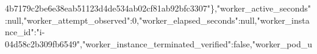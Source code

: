 \documentclass[10pt]{article}
\begin{document}
4\allowbreak{}b\allowbreak{}7\allowbreak{}1\allowbreak{}7\allowbreak{}9\allowbreak{}c\allowbreak{}2\allowbreak{}b\allowbreak{}e\allowbreak{}6\allowbreak{}e\allowbreak{}3\allowbreak{}8\allowbreak{}e\allowbreak{}a\allowbreak{}b\allowbreak{}5\allowbreak{}1\allowbreak{}1\allowbreak{}2\allowbreak{}3\allowbreak{}d\allowbreak{}4\allowbreak{}d\allowbreak{}e\allowbreak{}5\allowbreak{}3\allowbreak{}4\allowbreak{}a\allowbreak{}b\allowbreak{}0\allowbreak{}2\allowbreak{}c\allowbreak{}f\allowbreak{}8\allowbreak{}1\allowbreak{}a\allowbreak{}b\allowbreak{}9\allowbreak{}2\allowbreak{}b\allowbreak{}f\allowbreak{}c\allowbreak{}3\allowbreak{}3\allowbreak{}0\allowbreak{}7\allowbreak{}"\allowbreak{}\}\allowbreak{},\allowbreak{}"\allowbreak{}w\allowbreak{}o\allowbreak{}r\allowbreak{}k\allowbreak{}e\allowbreak{}r\allowbreak{}\_\allowbreak{}a\allowbreak{}c\allowbreak{}t\allowbreak{}i\allowbreak{}v\allowbreak{}e\allowbreak{}\_\allowbreak{}s\allowbreak{}e\allowbreak{}c\allowbreak{}o\allowbreak{}n\allowbreak{}d\allowbreak{}s\allowbreak{}"\allowbreak{}:\allowbreak{}n\allowbreak{}u\allowbreak{}l\allowbreak{}l\allowbreak{},\allowbreak{}"\allowbreak{}w\allowbreak{}o\allowbreak{}r\allowbreak{}k\allowbreak{}e\allowbreak{}r\allowbreak{}\_\allowbreak{}a\allowbreak{}t\allowbreak{}t\allowbreak{}e\allowbreak{}m\allowbreak{}p\allowbreak{}t\allowbreak{}\_\allowbreak{}o\allowbreak{}b\allowbreak{}s\allowbreak{}e\allowbreak{}r\allowbreak{}v\allowbreak{}e\allowbreak{}d\allowbreak{}"\allowbreak{}:\allowbreak{}0\allowbreak{},\allowbreak{}"\allowbreak{}w\allowbreak{}o\allowbreak{}r\allowbreak{}k\allowbreak{}e\allowbreak{}r\allowbreak{}\_\allowbreak{}e\allowbreak{}l\allowbreak{}a\allowbreak{}p\allowbreak{}s\allowbreak{}e\allowbreak{}d\allowbreak{}\_\allowbreak{}s\allowbreak{}e\allowbreak{}c\allowbreak{}o\allowbreak{}n\allowbreak{}d\allowbreak{}s\allowbreak{}"\allowbreak{}:\allowbreak{}n\allowbreak{}u\allowbreak{}l\allowbreak{}l\allowbreak{},\allowbreak{}"\allowbreak{}w\allowbreak{}o\allowbreak{}r\allowbreak{}k\allowbreak{}e\allowbreak{}r\allowbreak{}\_\allowbreak{}i\allowbreak{}n\allowbreak{}s\allowbreak{}t\allowbreak{}a\allowbreak{}n\allowbreak{}c\allowbreak{}e\allowbreak{}\_\allowbreak{}i\allowbreak{}d\allowbreak{}"\allowbreak{}:\allowbreak{}"\allowbreak{}i\allowbreak{}-\allowbreak{}0\allowbreak{}4\allowbreak{}d\allowbreak{}5\allowbreak{}8\allowbreak{}c\allowbreak{}2\allowbreak{}b\allowbreak{}3\allowbreak{}0\allowbreak{}9\allowbreak{}f\allowbreak{}b\allowbreak{}6\allowbreak{}5\allowbreak{}4\allowbreak{}9\allowbreak{}"\allowbreak{},\allowbreak{}"\allowbreak{}w\allowbreak{}o\allowbreak{}r\allowbreak{}k\allowbreak{}e\allowbreak{}r\allowbreak{}\_\allowbreak{}i\allowbreak{}n\allowbreak{}s\allowbreak{}t\allowbreak{}a\allowbreak{}n\allowbreak{}c\allowbreak{}e\allowbreak{}\_\allowbreak{}t\allowbreak{}e\allowbreak{}r\allowbreak{}m\allowbreak{}i\allowbreak{}n\allowbreak{}a\allowbreak{}t\allowbreak{}e\allowbreak{}d\allowbreak{}\_\allowbreak{}v\allowbreak{}e\allowbreak{}r\allowbreak{}i\allowbreak{}f\allowbreak{}i\allowbreak{}e\allowbreak{}d\allowbreak{}"\allowbreak{}:\allowbreak{}f\allowbreak{}a\allowbreak{}l\allowbreak{}s\allowbreak{}e\allowbreak{},\allowbreak{}"\allowbreak{}w\allowbreak{}o\allowbreak{}r\allowbreak{}k\allowbreak{}e\allowbreak{}r\allowbreak{}\_\allowbreak{}p\allowbreak{}o\allowbreak{}d\allowbreak{}\_\allowbreak{}u\al
\end{document}
